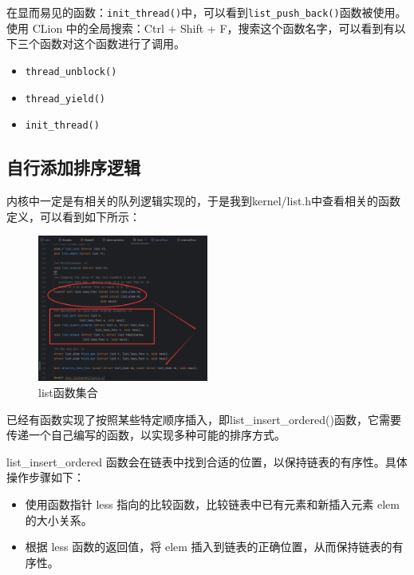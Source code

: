 在显而易见的函数：\texttt{init\_thread()}中，可以看到\texttt{list\_push\_back()}函数被使用。
使用 CLion 中的全局搜索：Ctrl + Shift + F，搜索这个函数名字，可以看到有以下三个函数对这个函数进行了调用。

\begin{itemize}
    \item \texttt{thread\_unblock()}\\
    \item \texttt{thread\_yield()}\\
    \item \texttt{init\_thread()}
\end{itemize}

\subsection{自行添加排序逻辑}

内核中一定是有相关的队列逻辑实现的，于是我到kernel/list.h中查看相关的函数定义，可以看到如下所示：

\begin{figure} [H]
    \centering
    \includegraphics[width=0.5\textwidth]{img3/check.png}
    \caption{list函数集合}
    \label{fig:list_push_back}
\end{figure}

已经有函数实现了按照某些特定顺序插入，即list\_insert\_ordered()函数，它需要传递一个自己编写的函数，以实现多种可能的排序方式。

list\_insert\_ordered 函数会在链表中找到合适的位置，以保持链表的有序性。具体操作步骤如下：

\begin{itemize}
    \item 使用函数指针 less 指向的比较函数，比较链表中已有元素和新插入元素 elem 的大小关系。
    \item 根据 less 函数的返回值，将 elem 插入到链表的正确位置，从而保持链表的有序性。
\end{itemize}

